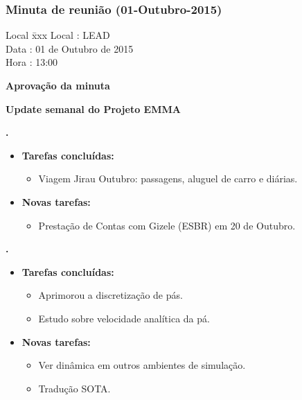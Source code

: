 \subsubsection{Minuta de reunião (01-Outubro-2015)}

\begin{tabbing}
  Local \= xxx \kill
  Local \> : LEAD \\
  Data  \> : 01 de Outubro de 2015 \\
  Hora  \> : 13:00
\end{tabbing}


\textbf{Aprovação da minuta}

\textbf{Update semanal do Projeto EMMA}
   							
\textbf{\alana.} 
	\begin{itemize}
		\item \textbf{Tarefas concluídas:}
			\begin{itemize}    
				\item Viagem Jirau Outubro: passagens, aluguel de carro e diárias.

			 
			\end{itemize}
		
		\item \textbf{Novas tarefas:}
			\begin{itemize} 
				\item Prestação de Contas com Gizele (ESBR) em 20 de Outubro.
			\end{itemize}
	\end{itemize}   		

	  \textbf{\renan.} 
	\begin{itemize}
		\item \textbf{Tarefas concluídas:}
			\begin{itemize}    
				\item Aprimorou a discretização de pás.
				\item Estudo sobre velocidade analítica da pá.
			\end{itemize}
		
		\item \textbf{Novas tarefas:}
			\begin{itemize} 
			    \item Ver dinâmica em outros ambientes de simulação.
			    \item Tradução SOTA.
			\end{itemize}
	\end{itemize}	
	
